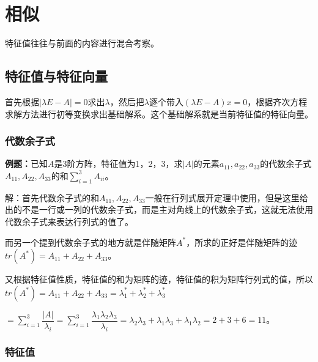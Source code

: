 \setcounter{tocdepth}{4}
\setcounter{secnumdepth}{4}
\renewcommand{\baselinestretch}{1.5}
\chapter{相似}

特征值往往与前面的内容进行混合考察。

\section{特征值与特征向量}

首先根据$\vert\lambda E-A\vert=0$求出$\lambda$，然后把$\lambda$逐个带入$(\lambda E-A)x=0$，根据齐次方程求解方法进行初等变换求出基础解系。这个基础解系就是当前特征值的特征向量。

\subsection{代数余子式}

\textbf{例题：}已知$A$是3阶方阵，特征值为1，2，3，求$\vert A\vert$的元素$a_{11},a_{22},a_{33}$的代数余子式$A_{11},A_{22},A_{33}$的和$\sum\limits_{i=1}^3A_{ii}$。

解：首先代数余子式的和$A_{11},A_{22},A_{33}$一般在行列式展开定理中使用，但是这里给出的不是一行或一列的代数余子式，而是主对角线上的代数余子式，这就无法使用代数余子式来表达行列式的值了。

而另一个提到代数余子式的地方就是伴随矩阵$A^*$，所求的正好是伴随矩阵的迹$tr(A^*)=A_{11}+A_{22}+A_{33}$。

又根据特征值性质，特征值的和为矩阵的迹，特征值的积为矩阵行列式的值，所以$tr(A^*)=A_{11}+A_{22}+A_{33}=\lambda_1^*+\lambda_2^*+\lambda_3^*$

$=\sum\limits_{i=1}^3\dfrac{\vert A\vert}{\lambda_i}=\sum\limits_{i=1}^3\dfrac{\lambda_1\lambda_2\lambda_3}{\lambda_i}=\lambda_2\lambda_3+\lambda_1\lambda_3+\lambda_1\lambda_2=2+3+6=11$。

\subsection{特征值}

